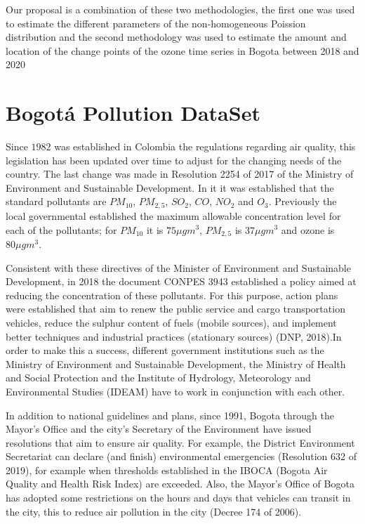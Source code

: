 \documentclass[APA,STIX1COL]{WileyNJD-v2}
\begin{document}
Our proposal is a combination of these two methodologies, the first one was used to estimate the different parameters of the non-homogeneous Poission distribution and the second methodology was used to estimate the amount and location of the change points of the ozone time series in Bogota between 2018 and 2020


\section{Bogotá Pollution DataSet}\label{sec3}

Since $1982$ was established in Colombia the regulations regarding air quality, this legislation has been updated over time to adjust for the changing needs of the country. The last change was made in Resolution 2254 of 2017 of the Ministry of Environment and Sustainable Development. In it it was established that the standard pollutants are $PM_{10}$, $PM_{2,5}$, $SO_2$, $CO$, $NO_2$ and $O_3$. Previously the local governmental established the maximum allowable concentration level for each of the pollutants; for $PM_{10}$ it is $75 \mu g m^3$, $PM_{2,5}$ is $37 \mu g m^3$ and ozone is $80 \mu g m^3$. \cite{decenal}

Consistent with these directives of the Minister of Environment and Sustainable Development, in 2018 the document CONPES 3943  established a policy aimed at reducing the concentration of these pollutants. For this purpose, action plans were established that aim to renew the public service and cargo transportation vehicles, reduce the sulphur content of fuels (mobile sources), and implement better techniques and industrial practices (stationary sources) (DNP, 2018).In order to make this a success, different government institutions such as the Ministry of Environment and Sustainable Development, the Ministry of Health and Social Protection and the Institute of Hydrology, Meteorology and Environmental Studies (IDEAM) have to work in conjunction with each other.

In addition to national guidelines and plans, since 1991, Bogota through the Mayor's Office and the city's Secretary of the Environment have issued resolutions that aim to ensure air quality. For example, the District Environment Secretariat can declare (and finish) environmental emergencies (Resolution 632 of 2019), for example when thresholds established in the IBOCA (Bogota Air Quality and Health Risk Index) are exceeded. Also, the Mayor's Office of Bogota has adopted some restrictions on the hours and days that vehicles can transit in the city, this to reduce air pollution in the city (Decree 174 of 2006).
\end{document}
